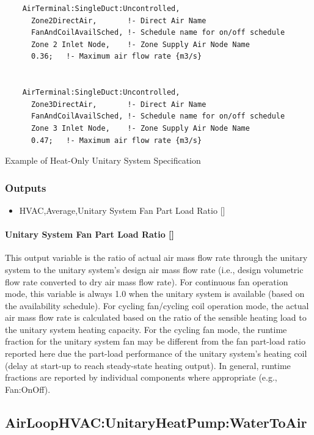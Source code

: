 \begin{lstlisting}
    AirTerminal:SingleDuct:Uncontrolled,
      Zone2DirectAir,       !- Direct Air Name
      FanAndCoilAvailSched, !- Schedule name for on/off schedule
      Zone 2 Inlet Node,    !- Zone Supply Air Node Name
      0.36;   !- Maximum air flow rate {m3/s}


    AirTerminal:SingleDuct:Uncontrolled,
      Zone3DirectAir,       !- Direct Air Name
      FanAndCoilAvailSched, !- Schedule name for on/off schedule
      Zone 3 Inlet Node,    !- Zone Supply Air Node Name
      0.47;   !- Maximum air flow rate {m3/s}
\end{lstlisting}

Example of Heat-Only Unitary System Specification

\subsubsection{Outputs}\label{outputs-5-011}

\begin{itemize}
\tightlist
\item
  HVAC,Average,Unitary System Fan Part Load Ratio {[]}
\end{itemize}

\paragraph{Unitary System Fan Part Load Ratio {[]}}\label{unitary-system-fan-part-load-ratio-6}

This output variable is the ratio of actual air mass flow rate through the unitary system to the unitary system's design air mass flow rate (i.e., design volumetric flow rate converted to dry air mass flow rate). For continuous fan operation mode, this variable is always 1.0 when the unitary system is available (based on the availability schedule). For cycling fan/cycling coil operation mode, the actual air mass flow rate is calculated based on the ratio of the sensible heating load to the unitary system heating capacity. For the cycling fan mode, the runtime fraction for the unitary system fan may be different from the fan part-load ratio reported here due the part-load performance of the unitary system's heating coil (delay at start-up to reach steady-state heating output). In general, runtime fractions are reported by individual components where appropriate (e.g., Fan:OnOff).

\subsection{AirLoopHVAC:UnitaryHeatPump:WaterToAir}\label{airloophvacunitaryheatpumpwatertoair}

